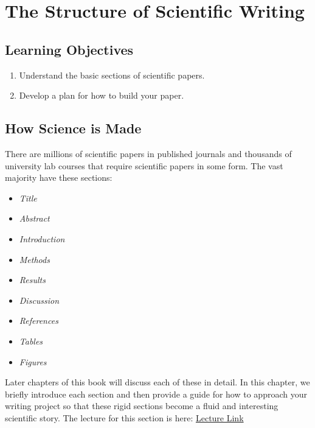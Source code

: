 \documentclass[
]{article}
\author{}
\date{\vspace{-2.5em}}
\providecommand{\tightlist}{%
  \setlength{\itemsep}{0pt}\setlength{\parskip}{0pt}}
\begin{document}
\hypertarget{the-structure-of-scientific-writing}{%
\section{The Structure of Scientific
Writing}\label{the-structure-of-scientific-writing}}

\hypertarget{learning-objectives}{%
\subsection{Learning Objectives}\label{learning-objectives}}

\begin{enumerate}
\def\labelenumi{\arabic{enumi}.}
\item
  Understand the basic sections of scientific papers.
\item
  Develop a plan for how to build your paper.
\end{enumerate}

\hypertarget{how-science-is-made}{%
\subsection{How Science is Made}\label{how-science-is-made}}

There are millions of scientific papers in published journals and
thousands of university lab courses that require scientific papers in
some form. The vast majority have these sections:

\begin{itemize}
\tightlist
\item
  \emph{Title}
\item
  \emph{Abstract}
\item
  \emph{Introduction}
\item
  \emph{Methods}
\item
  \emph{Results}
\item
  \emph{Discussion}
\item
  \emph{References}
\item
  \emph{Tables}
\item
  \emph{Figures}
\end{itemize}

Later chapters of this book will discuss each of these in detail. In
this chapter, we briefly introduce each section and then provide a guide
for how to approach your writing project so that these rigid sections
become a fluid and interesting scientific story. The lecture for this
section is here:
\href{https://docs.google.com/presentation/d/1t8Ggc_xpu1eapc2UbTm8kGzCPWLQLi4AXnKyjM_4jKM/edit?usp=sharing}{Lecture
Link}
\end{document}
